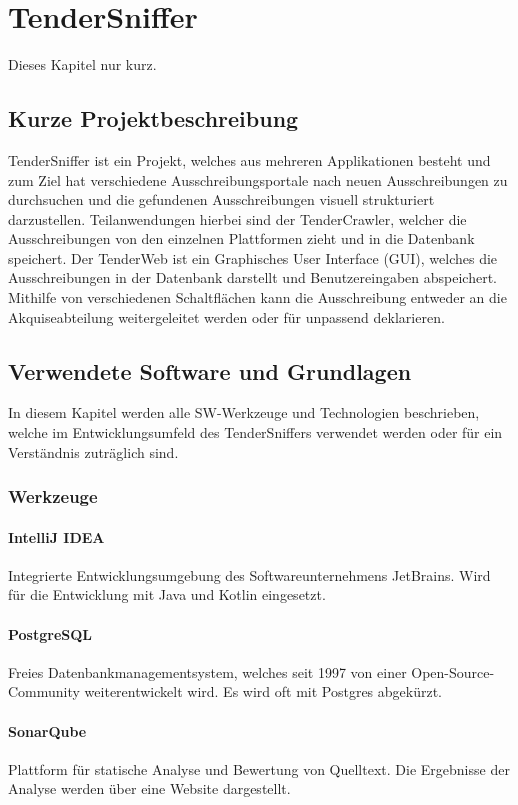 \chapter{TenderSniffer}
Dieses Kapitel nur kurz.

\section{Kurze Projektbeschreibung}
TenderSniffer ist ein Projekt, welches aus mehreren Applikationen besteht und zum Ziel hat verschiedene
Ausschreibungsportale nach neuen Ausschreibungen zu durchsuchen und die gefundenen Ausschreibungen visuell strukturiert
darzustellen. Teilanwendungen hierbei sind der TenderCrawler, welcher die Ausschreibungen von den einzelnen Plattformen
zieht und in die Datenbank speichert. Der TenderWeb ist ein Graphisches User Interface (GUI), welches die
Ausschreibungen in der Datenbank darstellt und Benutzereingaben abspeichert. Mithilfe von verschiedenen Schaltflächen
kann die Ausschreibung entweder an die Akquiseabteilung weitergeleitet werden oder für unpassend deklarieren.

\section{Verwendete Software und Grundlagen}
In diesem Kapitel werden alle SW-Werkzeuge und Technologien beschrieben, welche im Entwicklungsumfeld des TenderSniffers
verwendet werden oder für ein Verständnis zuträglich sind.

\subsection{Werkzeuge}

\subsubsection{IntelliJ IDEA}
Integrierte Entwicklungsumgebung des Softwareunternehmens JetBrains. Wird für die Entwicklung mit Java und Kotlin
eingesetzt. 

\subsubsection{PostgreSQL}
Freies Datenbankmanagementsystem, welches seit 1997 von einer Open-Source-Community weiterentwickelt wird. Es wird oft
mit Postgres abgekürzt.

\subsubsection{SonarQube}
Plattform für statische Analyse und Bewertung von Quelltext. Die Ergebnisse der Analyse werden über eine Website dargestellt.

